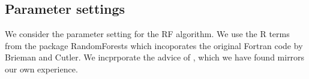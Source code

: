 \documentclass[10pt,a4paper]{article}  %
\begin{document}









\subsection*{Parameter settings}
We consider the parameter setting for the RF algorithm. We use the R terms from the package RandomForests
\cite{Liaw.and.Weiner.2002} which incoporates the original Fortran code by Brieman and Cutler. We incprporate the 
advice of \cite{Liaw.and.Weiner.2002}, which we have found mirrors our own experience.
\end{document}
